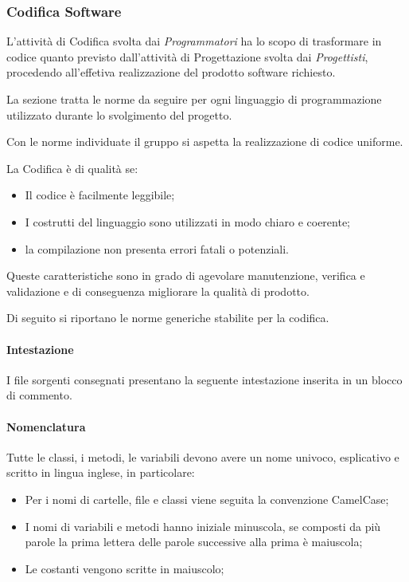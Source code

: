 \subsubsection{Codifica Software}
L'attività di Codifica svolta dai \textit{Programmatori} ha lo scopo di trasformare in codice quanto previsto dall'attività di Progettazione svolta dai \textit{Progettisti}, procedendo all'effetiva realizzazione del prodotto software richiesto.

La sezione tratta le norme da seguire per ogni linguaggio di programmazione utilizzato durante lo svolgimento del progetto.

Con le norme individuate il gruppo si aspetta la realizzazione di codice uniforme.

La Codifica è di qualità se: 
\begin{itemize}
	\item Il codice è facilmente leggibile;
	\item I costrutti del linguaggio sono utilizzati in modo chiaro e coerente;
	\item la compilazione non presenta errori fatali o potenziali.
\end{itemize}
Queste caratteristiche sono in grado di agevolare manutenzione, verifica e validazione e di conseguenza migliorare la qualità di prodotto.

Di seguito si riportano le norme generiche stabilite per la codifica.
\paragraph*{Intestazione}
I file sorgenti consegnati presentano la seguente intestazione inserita in un blocco di commento.
\paragraph*{Nomenclatura}
Tutte le classi, i metodi, le variabili devono avere un nome univoco, esplicativo e scritto in lingua inglese, in particolare:
\begin{itemize}
	\item Per i nomi di cartelle, file e classi viene seguita la convenzione CamelCase;
	\item I nomi di variabili e metodi hanno iniziale minuscola, se composti da più parole la prima lettera delle parole successive alla prima è maiuscola;
	\item Le costanti vengono scritte in maiuscolo;
\end{itemize}
